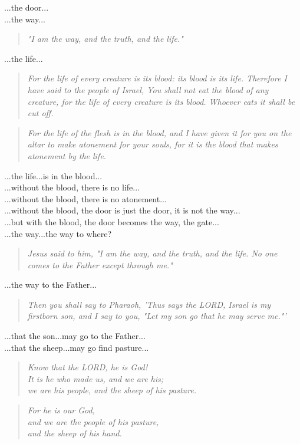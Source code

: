 \documentclass[10pt,oneside,footinclude=true,headinclude=true]{scrbook} %
\newcommand\quot[1]{
	\begin{quote}\textit{\small#1}\end{quote}
}
\begin{document}
\noindent...the door...\\
...the way...

\quot{"I am the way, and the truth, and the life."}

\noindent...the life...

\quot{For the life of every creature is its blood: its blood is its life. Therefore I have said to the people of Israel, You shall not eat the blood of any creature, for the life of every creature is its blood. Whoever eats it shall be cut off.}

\quot{For the life of the flesh is in the blood, and I have given it for you on the altar to make atonement for your souls, for it is the blood that makes atonement by the life.}

\noindent...the life...is in the blood...\\
...without the blood, there is no life...\\
...without the blood, there is no atonement...\\
...without the blood, the door is just the door, it is not the way...\\
...but with the blood, the door becomes the way, the gate...\\

\noindent...the way...the way to where?

\quot{Jesus said to him, "I am the way, and the truth, and the life. No one comes to the Father except through me."}

\noindent...the way to the Father...

\quot{Then you shall say to Pharaoh, 'Thus says the LORD, Israel is my firstborn son,  and I say to you, "Let my son go that he may serve me."'}

\noindent...that the son...may go to the Father...\\
...that the sheep...may go find pasture...

\quot{Know that the LORD, he is God!\\
\hspace*{5mm}It is he who made us, and we are his;\\
\hspace*{5mm}we are his people, and the sheep of his pasture.}

\quot{For he is our God,\\
\hspace*{5mm}and we are the people of his pasture,\\
\hspace*{5mm}and the sheep of his hand.}
\end{document}
